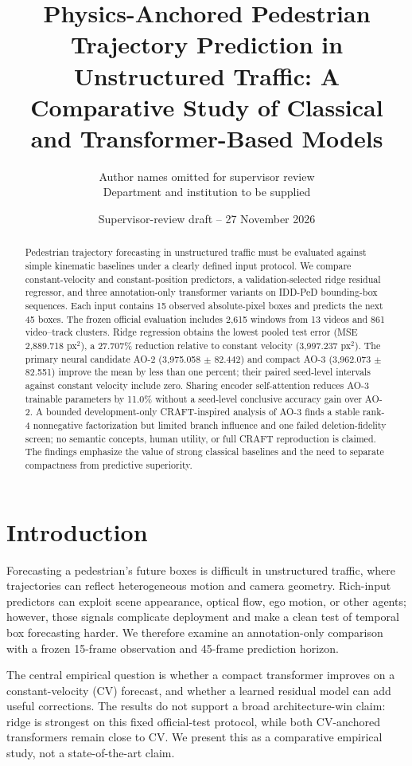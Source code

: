 \documentclass[11pt]{article}
\title{Physics-Anchored Pedestrian Trajectory Prediction in Unstructured Traffic: A Comparative Study of Classical and Transformer-Based Models}
\author{Author names omitted for supervisor review\\Department and institution to be supplied}
\date{Supervisor-review draft -- 27 November 2026}
\begin{document}
\maketitle
\begin{abstract}
Pedestrian trajectory forecasting in unstructured traffic must be evaluated against simple kinematic baselines under a clearly defined input protocol. We compare constant-velocity and constant-position predictors, a validation-selected ridge residual regressor, and three annotation-only transformer variants on IDD-PeD bounding-box sequences. Each input contains 15 observed absolute-pixel boxes and predicts the next 45 boxes. The frozen official evaluation includes 2,615 windows from 13 videos and 861 video--track clusters. Ridge regression obtains the lowest pooled test error (MSE 2,889.718 px$^2$), a 27.707\% reduction relative to constant velocity (3,997.237 px$^2$). The primary neural candidate AO-2 (3,975.058 $\pm$ 82.442) and compact AO-3 (3,962.073 $\pm$ 82.551) improve the mean by less than one percent; their paired seed-level intervals against constant velocity include zero. Sharing encoder self-attention reduces AO-3 trainable parameters by 11.0\% without a seed-level conclusive accuracy gain over AO-2. A bounded development-only CRAFT-inspired analysis of AO-3 finds a stable rank-4 nonnegative factorization but limited branch influence and one failed deletion-fidelity screen; no semantic concepts, human utility, or full CRAFT reproduction is claimed. The findings emphasize the value of strong classical baselines and the need to separate compactness from predictive superiority.
\end{abstract}

\section{Introduction}
Forecasting a pedestrian's future boxes is difficult in unstructured traffic, where trajectories can reflect heterogeneous motion and camera geometry. Rich-input predictors can exploit scene appearance, optical flow, ego motion, or other agents; however, those signals complicate deployment and make a clean test of temporal box forecasting harder. We therefore examine an annotation-only comparison with a frozen 15-frame observation and 45-frame prediction horizon.

The central empirical question is whether a compact transformer improves on a constant-velocity (CV) forecast, and whether a learned residual model can add useful corrections. The results do not support a broad architecture-win claim: ridge is strongest on this fixed official-test protocol, while both CV-anchored transformers remain close to CV. We present this as a comparative empirical study, not a state-of-the-art claim.
\end{document}
